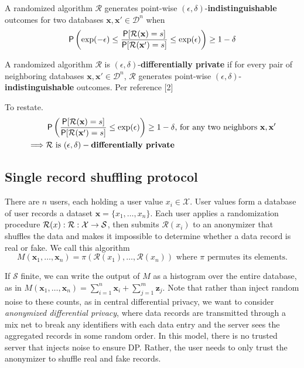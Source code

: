\documentclass[11pt]{article}
\newcommand{\bbx}{\pmb{x}}
\newcommand{\bbz}{\pmb{z}}
\newcommand{\cX}{\mathcal{X}}
\newcommand{\cR}{\mathcal{R}}
\newcommand{\Dsp}{\mathcal{D}}
\newcommand{\Ssp}{\mathcal{S}}
\newcommand{\xv}{\mathbf{x}}
\begin{document}
\begin{defn}
A randomized algorithm $\cR$ generates point-wise  $(\epsilon,\delta)$-\textbf{indistinguishable} outcomes for two databases $\xv,\xv' \in \Dsp^n$ when
\begin{equation} \label{eq:dpcnt}
\P \left ( \exp(-\epsilon) \le \frac{\P[\cR(\xv) = s]}{\P[\cR(\xv') = s]} \le  \exp(\epsilon) \right ) \ge 1 - \delta
\end{equation}
\end{defn}

\begin{prop} \label{prop:dpcnt}
A randomized algorithm $\cR$ is $(\epsilon,\delta)$-\textbf{differentially private} if for every pair of neighboring databases $\xv,\xv' \in \Dsp^n$, $\cR$ generates point-wise  $(\epsilon,\delta)$-\textbf{indistinguishable} outcomes.   Per reference [2]

To restate.
\begin{align} \label{eq:dpcnt}
 & \P \left ( \frac{\P[\cR(\xv) = s]}{\P[\cR(\xv') = s]} \le  \exp(\epsilon) \right ) \ge 1 - \delta \text{, for any two neighbors } \xv,\xv' \\
\implies & \cR \text{ is } (\epsilon,\delta)-\textbf{differentially private}
\end{align}

\end{prop}

\subsection{Single record shuffling protocol}

There are $n$ users, each holding a user value $x_i \in \cX$.  User values form a database of user records a dataset $\bbx = \{x_1,\dots ,x_n\}$. Each user applies a randomization procedure $\cR(x): \map{\cR}{\cX}{\Ssp}$, then submits $\cR(x_i)$ to an anonymizer that shuffles the data and makes it impossible to determine whether a data record is real or fake. We call this algorithm 
\[
M(\bbx_1,  \dots , \bbx_n) = \pi (\cR(x_1), \dots , \cR(x_n)) \text{ where } \pi \text{ permutes its elements}. 
\]

If $\Ssp$ finite,  we can write the output of $M$ as a histogram over the entire database, as in $M(\bbx_1,  \dots , \bbx_n) = \sum^n_{i=1} \bbx_i + \sum^m_{j=1} \bbz_j$. Note that rather than inject random noise to these counts, as in central differential privacy, we want to consider \emph{anonymized differential privacy}, where data records are transmitted through a mix net to break any identifiers with each data entry and the server sees the aggregated records in some random order. In this model, there is no trusted server that injects noise to ensure DP. Rather, the user needs to only trust the anonymizer to shuffle real and fake records.
\end{document}
